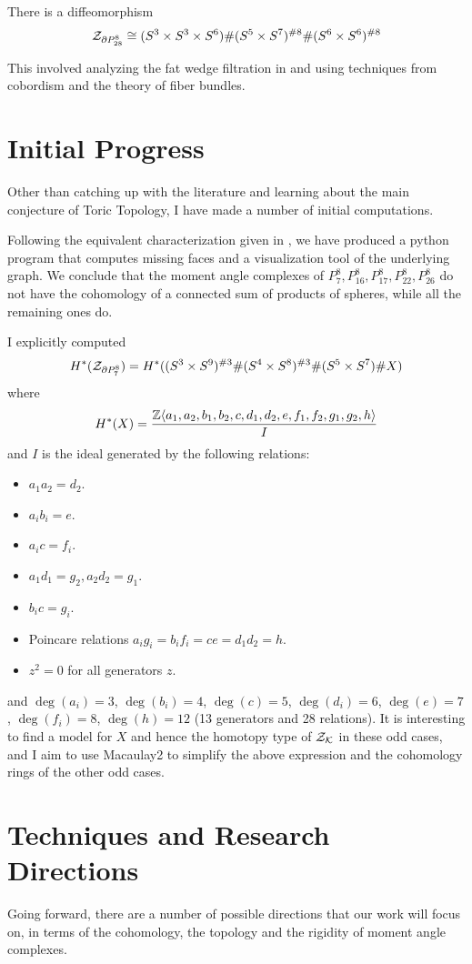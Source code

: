 \documentclass[a4paper]{article}
\begin{document}
\begin{thm}
There is a diffeomorphism $$\mathcal{Z}_{\partial P_{28}^8}\cong(S^3\times S^3\times S^6)\#(S^5\times S^7)^{\#8}\#(S^6\times S^6)^{\#8}$$
\end{thm}

This involved analyzing the fat wedge filtration in \cite{IK} and using techniques from cobordism and the theory of fiber bundles. 

\section*{Initial Progress}
Other than catching up with the literature and learning about the main conjecture of Toric Topology, I have made a number of initial computations. 

Following the equivalent characterization given in \cite{Oganisian}, we have produced a python program that computes missing faces and a visualization tool of the underlying graph. We conclude that the moment angle complexes of $P_7^8,P_{16}^8,P_{17}^8,P_{22}^8,P_{26}^8$ do not have the cohomology of a connected sum of products of spheres, while all the remaining ones do. 

I explicitly computed $$H^\ast(\mathcal{Z}_{\partial P_7^8})=H^\ast((S^3\times S^9)^{\#3}\#(S^4\times S^8)^{\#3}\#(S^5\times S^7)\# X)$$ where $$H^\ast(X)=\frac{\mathbb{Z}\langle a_1,a_2,b_1,b_2,c,d_1,d_2,e,f_1,f_2,g_1,g_2,h\rangle}{I}$$ and $I$ is the ideal generated by the following relations: 
\begin{itemize}
\item $a_1a_2=d_2$. 
\item $a_ib_i=e$. 
\item $a_ic=f_i$. 
\item $a_1d_1=g_2,a_2d_2=g_1$. 
\item $b_ic=g_i$. 
\item Poincare relations $a_ig_i=b_if_i=ce=d_1d_2=h$. 
\item $z^2=0$ for all generators $z$. 
\end{itemize}
and $\deg(a_i)=3$, $\deg(b_i)=4$, $\deg(c)=5$, $\deg(d_i)=6$, $\deg(e)=7$, $\deg(f_i)=8$, $\deg(h)=12$ (13 generators and 28 relations). It is interesting to find a model for $X$ and hence the homotopy type of $\mathcal{Z}_{\mathcal{K}}$ in these odd cases, and I aim to use Macaulay2 to simplify the above expression and the cohomology rings of the other odd cases. 

\section*{Techniques and Research Directions}
Going forward, there are a number of possible directions that our work will focus on, in terms of the cohomology, the topology and the rigidity of moment angle complexes. 
\end{document}
